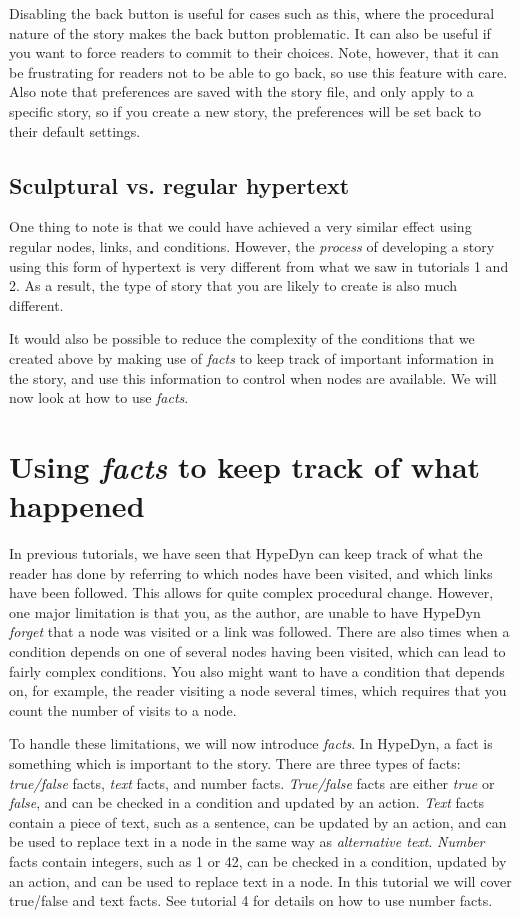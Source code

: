 \documentclass{article}
\begin{document}
Disabling the back button is useful for cases such as this, where the procedural nature of the story makes the back button problematic. It can also be useful if you want to force readers to commit to their choices. Note, however, that it can be frustrating for readers not to be able to go back, so use this feature with care. Also note that preferences are saved with the story file, and only apply to a specific story, so if you create a new story, the preferences will be set back to their default settings.

\subsection{Sculptural vs. regular hypertext}

One thing to note is that we could have achieved a very similar effect using regular nodes, links, and conditions. However, the \textit{process} of developing a story using this form of hypertext is very different from what we saw in tutorials 1 and 2. As a result, the type of story that you are likely to create is also much different.

It would also be possible to reduce the complexity of the conditions that we created above by making use of \textit{facts} to keep track of important information in the story, and use this information to control when nodes are available. We will now look at how to use \textit{facts}.

\section{Using \textit{facts} to keep track of what happened}

In previous tutorials, we have seen that HypeDyn can keep track of what the reader has done by referring to which nodes have been visited, and which links have been followed. This allows for quite complex procedural change. However, one major limitation is that you, as the author, are unable to have HypeDyn \textit{forget} that a node was visited or a link was followed. There are also times when a condition depends on one of several nodes having been visited, which can lead to fairly complex conditions. You also might want to have a condition that depends on, for example, the reader visiting a node several times, which requires that you count the number of visits to a node.

To handle these limitations, we will now introduce \textit{facts}. In HypeDyn, a fact is something which is important to the story. There are three types of facts: \textit{true/false} facts, \textit{text} facts, and number facts. \textit{True/false} facts are either \textit{true} or \textit{false}, and can be checked in a condition and updated by an action. \textit{Text} facts contain a piece of text, such as a sentence, can be updated by an action, and can be used to replace text in a node in the same way as \textit{alternative text}. \textit{Number} facts contain integers, such as 1 or 42, can be checked in a condition, updated by an action, and can be used to replace text in a node. In this tutorial we will cover true/false and text facts. See tutorial 4 for details on how to use number facts.
\end{document}
